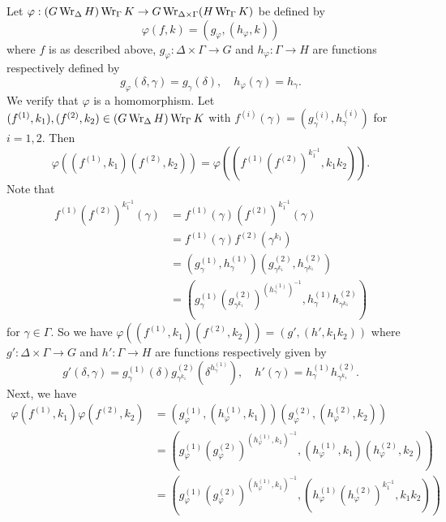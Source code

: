 \begin{sketch}
	Let $\varphi:(G\operatorname{Wr}_\Delta H) \operatorname{Wr}_\Gamma K \to G\operatorname{Wr}_{\Delta\times \Gamma} (H \operatorname{Wr}_\Gamma K)$ be defined by
	\begin{equation*}
		\varphi(f,k) = (g_\varphi,(h_\varphi,k))
	\end{equation*}
	where $f$ is as described above, $g_\varphi:\Delta\times\Gamma\to G$ and $h_\varphi:\Gamma \to H$ are functions respectively defined by
\begin{equation*}
	g_\varphi(\delta,\gamma) = g_\gamma(\delta),\quad 	h_\varphi(\gamma)= h_\gamma.
\end{equation*}
We verify that $\varphi$ is a homomorphism. Let $(f^{(1)},k_1),(f^{(2)},k_2)\in (G\operatorname{Wr}_\Delta H) \operatorname{Wr}_\Gamma K$ with $f^{(i)}(\gamma) = (g^{(i)}_\gamma, h^{(i)}_\gamma)$  for $i=1,2$. Then
\begin{equation*}
	\varphi((f^{(1)},k_1)(f^{(2)},k_2)) = \varphi((f^{(1)}(f^{(2)})^{k_1^{-1}},k_1k_2)).
\end{equation*}
Note that 
\begin{align*}
	f^{(1)}(f^{(2)})^{k_1^{-1}}(\gamma) &= f^{(1)}(\gamma)(f^{(2)})^{k_1^{-1}}(\gamma) 
	\\
	&= 
	f^{(1)}(\gamma)f^{(2)}(\gamma^{k_1}) 
	\\
	&=(g^{(1)}_\gamma, h^{(1)}_\gamma)(g^{(2)}_{\gamma^{k_1}}, h^{(2)}_{\gamma^{k_1}})
	\\
	&= \left(g^{(1)}_\gamma (g^{(2)}_{\gamma^{k_1}})^{(h^{(1)}_\gamma)^{-1}}, h^{(1)}_\gamma h^{(2)}_{\gamma^{k_1}}\right)
\end{align*} for $\gamma\in\Gamma$. So we have $\varphi((f^{(1)},k_1)(f^{(2)},k_2)) = (g',(h',k_1k_2))$ where $g':\Delta\times\Gamma\to G$ and $h':\Gamma \to H$ are functions respectively given by
\begin{equation*}
	g'(\delta,\gamma) = g^{(1)}_\gamma(\delta)g^{(2)}_{\gamma^{k_1}}(\delta^{h_\gamma^{(1)}}),\quad h'(\gamma) = h^{(1)}_\gamma h^{(2)}_{\gamma^{k_1}}.
\end{equation*}
Next, we have 
\begin{align*}
	\varphi(f^{(1)},k_1) \varphi(f^{(2)},k_2) &= \left(g_\varphi^{(1)},(h_\varphi^{(1)},k_1)\right)\left(g_\varphi^{(2)},(h_\varphi^{(2)},k_2)\right)
	\\
	&= \left(g_\varphi^{(1)}(g_\varphi^{(2)})^{(h_\varphi^{(1)},k_1)^{-1}},(h_\varphi^{(1)},k_1)(h_\varphi^{(2)},k_2)\right)
	\\
	&=  \left(g_\varphi^{(1)}(g_\varphi^{(2)})^{(h_\varphi^{(1)},k_1)^{-1}},(h_\varphi^{(1)}(h_\varphi^{(2)})^{k_1^{-1}},k_1k_2)\right)
	\\

\end{align*}
\end{sketch}
